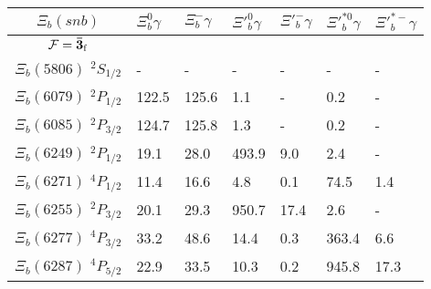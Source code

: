 \begin{tabular}{c |  p{0.65cm}  p{0.65cm}  p{0.65cm}  p{0.65cm}  p{0.65cm}  p{0.65cm}} \hline \hline
$\Xi_b(snb)$  & $\Xi_{b}^{0} \gamma$  & $\Xi_{b}^{-} \gamma$  & $\Xi'^{0}_{b} \gamma$  & $\Xi'^{-}_{b} \gamma$  & $\Xi'^{*0}_{b} \gamma$  & $\Xi'^{*-}_{b} \gamma$  \\ \hline
$\mathcal{F}={\bf {\bar{3}}}_{\rm f}$&&&&&&\\ \hline
$\Xi_b(5806)$ $^{2}S_{1/2}$&-  &-  &-  &-  &-  &- \\
$\Xi_b(6079)$ $^{2}P_{1/2}$&122.5  &125.6  &1.1  &-  &0.2  &- \\
$\Xi_b(6085)$ $^{2}P_{3/2}$&124.7  &125.8  &1.3  &-  &0.2  &- \\
$\Xi_b(6249)$ $^{2}P_{1/2}$&19.1  &28.0  &493.9  &9.0  &2.4  &- \\
$\Xi_b(6271)$ $^{4}P_{1/2}$&11.4  &16.6  &4.8  &0.1  &74.5  &1.4 \\
$\Xi_b(6255)$ $^{2}P_{3/2}$&20.1  &29.3  &950.7  &17.4  &2.6  &- \\
$\Xi_b(6277)$ $^{4}P_{3/2}$&33.2  &48.6  &14.4  &0.3  &363.4  &6.6 \\
$\Xi_b(6287)$ $^{4}P_{5/2}$&22.9  &33.5  &10.3  &0.2  &945.8  &17.3 \\
\hline \hline
\end{tabular}

